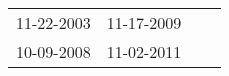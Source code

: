 \begin{supertabular}{llll}
 11-22-2003 &  11-17-2009 \\
 10-09-2008 &  11-02-2011 \\
\end{supertabular}
